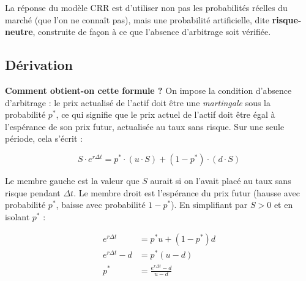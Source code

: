 \documentclass[11pt]{report}
\begin{document}
La réponse du modèle CRR est d'utiliser non pas les probabilités réelles du
marché (que l'on ne connaît pas), mais une probabilité artificielle, dite
\textbf{risque-neutre}, construite de façon à ce que l'absence d'arbitrage
soit vérifiée.

\subsection*{Dérivation}

\noindent{}

\medskip

\textbf{Comment obtient-on cette formule ?} On impose la condition
d'absence d'arbitrage : le prix actualisé de l'actif doit être une
\textit{martingale} sous la probabilité $p^*$, ce qui signifie que le prix
actuel de l'actif doit être égal à l'espérance de son prix futur,
actualisée au taux sans risque. Sur une seule période, cela s'écrit :

\begin{equation}
    S \cdot e^{r \Delta t} = p^* \cdot (u \cdot S) + (1 - p^*) \cdot (d \cdot S)
\end{equation}

Le membre gauche est la valeur que $S$ aurait si on l'avait placé au taux
sans risque pendant $\Delta t$. Le membre droit est l'espérance du prix
futur (hausse avec probabilité $p^*$, baisse avec probabilité $1-p^*$).
En simplifiant par $S > 0$ et en isolant $p^*$ :

\begin{align}
    e^{r \Delta t} &= p^* u + (1 - p^*) d \\
    e^{r \Delta t} - d &= p^*(u - d) \\
    p^* &= \frac{e^{r \Delta t} - d}{u - d}
\end{align}
\end{document}
